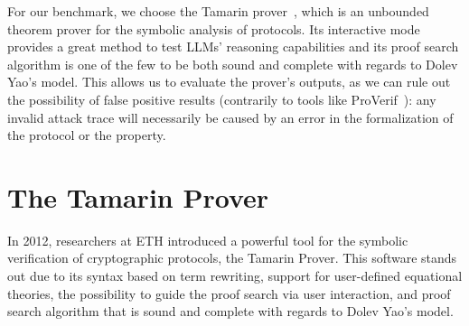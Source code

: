 
For our benchmark, we choose the Tamarin prover~\cite{TamarinFoundations}, which is an unbounded theorem prover for the symbolic analysis of protocols. Its interactive mode provides a great method to test LLMs' reasoning capabilities and its proof search algorithm is one of the few to be both sound and complete with regards to Dolev Yao's model. This allows us to evaluate the prover's outputs, as we can rule out the possibility of false positive results (contrarily to tools like ProVerif~\cite{proverif}): any invalid attack trace will necessarily be caused by an error in the formalization of the protocol or the property.


\section{The Tamarin Prover}
\label{sec:tamarinprover}

In 2012, researchers at ETH introduced a powerful tool for the symbolic verification of cryptographic protocols, the Tamarin Prover. This software stands out due to its syntax based on term rewriting, support for user-defined equational theories, the possibility to guide the proof search via user interaction, and proof search algorithm that is sound and complete with regards to Dolev Yao's model.

